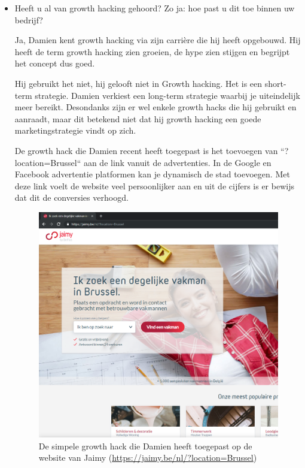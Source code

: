 \begin{itemize} 
	\item Heeft u al van growth hacking gehoord? Zo ja: hoe past u dit toe binnen uw bedrijf?
	
Ja, Damien kent growth hacking via zijn carrière die hij heeft opgebouwd. Hij heeft de term growth hacking zien groeien, de hype zien stijgen en begrijpt het concept dus goed.

Hij gebruikt het niet, hij gelooft niet in Growth hacking. Het is een short-term strategie. Damien verkiest een long-term strategie waarbij je uiteindelijk meer bereikt. Desondanks zijn er wel enkele growth hacks die hij gebruikt en aanraadt, maar dit betekend niet dat hij growth hacking een goede marketingstrategie vindt op zich. 

De growth hack die Damien recent heeft toegepast is het toevoegen van ``?location=Brussel`` aan de link vanuit de advertenties. In de Google en Facebook advertentie platformen kan je dynamisch de stad toevoegen. Met deze link voelt de website veel persoonlijker aan en uit de cijfers is er bewijs dat dit de conversies verhoogd.

\begin{figure}[h!]
	\includegraphics[width=\linewidth]{img/location-growth-hack.png}
	\centering
	\caption{De simpele growth hack die Damien heeft toegepast op de website van Jaimy (\href{https://jaimy.be/nl/?location=Brussel}{https://jaimy.be/nl/?location=Brussel})}
	\label{fig:fantalism}
\end{figure}
	

\end{itemize}
